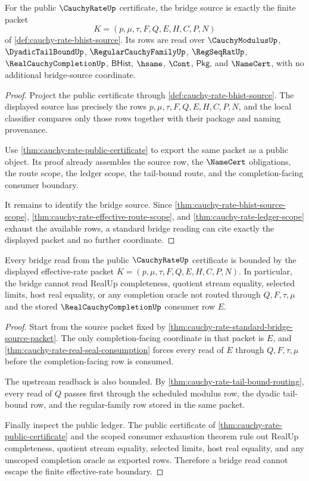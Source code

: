 \begin{theorem}
\label{thm:cauchy-rate-standard-bridge-source-packet}
For the public $\CauchyRateUp$ certificate, the bridge source is exactly the finite packet
$$
K=(p,\mu,\tau,F,Q,E,H,C,P,N)
$$
of \autoref{def:cauchy-rate-bhist-source}. Its rows are read over $\CauchyModulusUp$, $\DyadicTailBoundUp$, $\RegularCauchyFamilyUp$, $\RegSeqRatUp$, $\RealCauchyCompletionUp$, $\mathsf{BHist}$, $\hsame$, $\Cont$, $\mathsf{Pkg}$, and $\NameCert$, with no additional bridge-source coordinate.
\end{theorem}
\begin{proof}
Project the public certificate through \autoref{def:cauchy-rate-bhist-source}. The displayed source has precisely the rows $p,\mu,\tau,F,Q,E,H,C,P,N$, and the local classifier compares only those rows together with their package and naming provenance.

Use \autoref{thm:cauchy-rate-public-certificate} to export the same packet as a public object. Its proof already assembles the source row, the $\NameCert$ obligations, the route scope, the ledger scope, the tail-bound route, and the completion-facing consumer boundary.

It remains to identify the bridge source. Since \autoref{thm:cauchy-rate-bhist-source-scope}, \autoref{thm:cauchy-rate-effective-route-scope}, and \autoref{thm:cauchy-rate-ledger-scope} exhaust the available rows, a standard bridge reading can cite exactly the displayed packet and no further coordinate.
\end{proof}

\begin{theorem}
\label{thm:cauchy-rate-bridge-non-escape-boundary}
Every bridge read from the public $\CauchyRateUp$ certificate is bounded by the displayed effective-rate packet $K=(p,\mu,\tau,F,Q,E,H,C,P,N)$. In particular, the bridge cannot read RealUp completeness, quotient stream equality, selected limits, host real equality, or any completion oracle not routed through $Q,F,\tau,\mu$ and the stored $\RealCauchyCompletionUp$ consumer row $E$.
\end{theorem}
\begin{proof}
Start from the source packet fixed by \autoref{thm:cauchy-rate-standard-bridge-source-packet}. The only completion-facing coordinate in that packet is $E$, and \autoref{thm:cauchy-rate-real-seal-consumption} forces every read of $E$ through $Q,F,\tau,\mu$ before the completion-facing row is consumed.

The upstream readback is also bounded. By \autoref{thm:cauchy-rate-tail-bound-routing}, every read of $Q$ passes first through the scheduled modulus row, the dyadic tail-bound row, and the regular-family row stored in the same packet.

Finally inspect the public ledger. The public certificate of \autoref{thm:cauchy-rate-public-certificate} and the scoped consumer exhaustion theorem rule out RealUp completeness, quotient stream equality, selected limits, host real equality, and any unscoped completion oracle as exported rows. Therefore a bridge read cannot escape the finite effective-rate boundary.
\end{proof}

